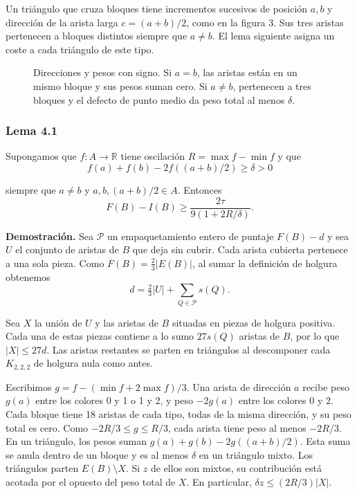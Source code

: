 \documentclass[spanish,11pt,a4paper]{article}
\begin{document}
Un triángulo que cruza bloques tiene incrementos sucesivos de posición \(a,b\) y dirección de la arista larga \(c=(a+b)/2\), como en la figura 3. Sus tres aristas pertenecen a bloques distintos siempre que \(a\ne b\). El lema siguiente asigna un coste a cada triángulo de este tipo.

\begin{figure}[htbp]
\centering
\caption{Direcciones y pesos con signo. Si $a=b$, las aristas están en un mismo bloque y sus pesos suman cero. Si $a\ne b$, pertenecen a tres bloques y el defecto de punto medio da peso total al menos $\delta$.}\label{fig:signed-triangle}
\end{figure}

\subsubsection{Lema 4.1}\label{lema-4.1}

Supongamos que \(f:A\to\mathbb R\) tiene oscilación \(R=\max f-\min f\) y que
\[f(a)+f(b)-2f((a+b)/2)\ge\delta>0\]

siempre que \(a\ne b\) y \(a,b,(a+b)/2\in A\). Entonces
\[F(B)-I(B)\ge \frac{2\tau}{9(1+2R/\delta)}.\]

\textbf{Demostración.} Sea \(\mathcal P\) un empaquetamiento entero de puntaje \(F(B)-d\) y sea \(U\) el conjunto de aristas de \(B\) que deja sin cubrir. Cada arista cubierta pertenece a una sola pieza. Como \(F(B)=\tfrac23|E(B)|\), al sumar la definición de holgura obtenemos
\[d=\tfrac23|U|+\sum_{Q\in\mathcal P}s(Q).\]

Sea \(X\) la unión de \(U\) y las aristas de \(B\) situadas en piezas de holgura positiva. Cada una de estas piezas contiene a lo sumo \(27s(Q)\) aristas de \(B\), por lo que \(|X|\le27d\). Las aristas restantes se parten en triángulos al descomponer cada \(K_{2,2,2}\) de holgura nula como antes.

Escribimos \(g=f-(\min f+2\max f)/3\). Una arista de dirección \(a\) recibe peso \(g(a)\) entre los colores 0 y 1 o 1 y 2, y peso \(-2g(a)\) entre los colores 0 y 2. Cada bloque tiene 18 aristas de cada tipo, todas de la misma dirección, y su peso total es cero. Como \(-2R/3\le g\le R/3\), cada arista tiene peso al menos \(-2R/3\). En un triángulo, los pesos suman \(g(a)+g(b)-2g((a+b)/2)\). Esta suma se anula dentro de un bloque y es al menos \(\delta\) en un triángulo mixto. Los triángulos parten \(E(B)\setminus X\). Si \(z\) de ellos son mixtos, su contribución está acotada por el opuesto del peso total de \(X\). En particular, \(\delta z\le(2R/3)|X|\).
\end{document}
